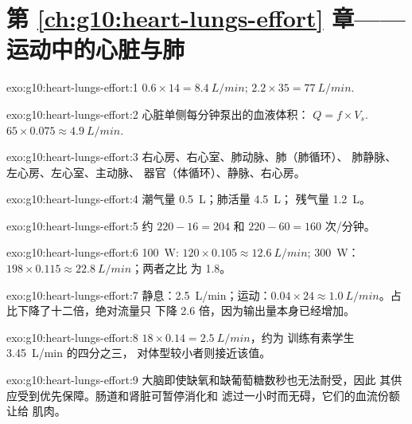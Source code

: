 \section*{第 \ref{ch:g10:heart-lungs-effort} 章——运动中的心脏与肺}

\begin{solution}{exo:g10:heart-lungs-effort:1}
$0.6 \times 14 = \qty{8.4}{L/min}$; $2.2 \times 35 = \qty{77}{L/min}$.
\end{solution}

\begin{solution}{exo:g10:heart-lungs-effort:2}
心脏单侧每分钟泵出的血液体积：
$Q = f \times V_s$. $65 \times 0.075 \approx \qty{4.9}{L/min}$.
\end{solution}

\begin{solution}{exo:g10:heart-lungs-effort:3}
右心房、右心室、肺动脉、肺（肺循环）、
肺静脉、左心房、左心室、主动脉、
器官（体循环）、静脉、右心房。
\end{solution}

\begin{solution}{exo:g10:heart-lungs-effort:4}
潮气量 \qty{0.5}{L}；肺活量 \qty{4.5}{L}；
残气量 \qty{1.2}{L}。
\end{solution}

\begin{solution}{exo:g10:heart-lungs-effort:5}
约 $220 - 16 = 204$ 和 $220 - 60 = 160$ 次/分钟。
\end{solution}

\begin{solution}{exo:g10:heart-lungs-effort:6}
\qty{100}{W}: $120 \times 0.105 \approx \qty{12.6}{L/min}$;
\qty{300}{W}：$198 \times 0.115 \approx \qty{22.8}{L/min}$；两者之比
为 1.8。
\end{solution}

\begin{solution}{exo:g10:heart-lungs-effort:7}
静息：\qty{2.5}{L/min}；运动：$0.04 \times 24 \approx
\qty{1.0}{L/min}$。占比下降了十二倍，绝对流量只
下降 2.6 倍，因为输出量本身已经增加。
\end{solution}

\begin{solution}{exo:g10:heart-lungs-effort:8}
$18 \times 0.14 = \qty{2.5}{L/min}$，约为
训练有素学生 \qty{3.45}{L/min} 的四分之三，
对体型较小者则接近该值。
\end{solution}

\begin{solution}{exo:g10:heart-lungs-effort:9}
大脑即使缺氧和缺葡萄糖数秒也无法耐受，因此
其供应受到优先保障。肠道和肾脏可暂停消化和
滤过一小时而无碍，它们的血流份额让给
肌肉。
\end{solution}

